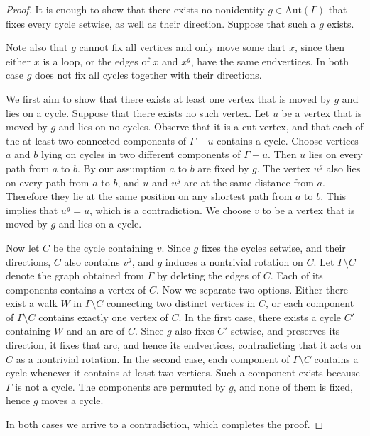 \documentclass{amsart}
\theoremstyle{plain}
\theoremstyle{definition}
\theoremstyle{remark}
\newcommand{\Aut}{\mathrm{Aut}}
\begin{document}
\begin{proof}
  It is enough to show that there
  exists no nonidentity $g\in\Aut(\Gamma)$ that fixes every cycle
  setwise, as well as their direction. Suppose that such a $g$ exists.
  
  Note also that $g$ cannot fix all vertices and only move some dart $x$, since then either $x$ is a loop, or the edges of $x$ and $x^g$, have the same
  endvertices. In both case $g$ does not fix all cycles together with their directions.

  We first aim to show that there exists at least one vertex that is moved by $g$ and lies on a
  cycle. Suppose that there exists no such vertex. Let $u$ be a vertex that is moved by $g$ and lies on
  no cycles. Observe that it is a cut-vertex, and that each of the at least two connected
  components of $\Gamma - u$ contains a cycle. Choose vertices $a$ and $b$ lying on cycles in two different components
  of $\Gamma-u$. Then $u$ lies on every path from $a$ to $b$. By our assumption $a$ to $b$ are fixed by $g$.
The vertex $u^g$ also lies on every path from $a$ to $b$, and $u$ and $u^g$ are at the same distance from $a$.
Therefore they
  lie at the same position on any shortest path from $a$ to $b$. This implies that $u^g=u$, which is a contradiction.
  We choose $v$ to be
  a vertex that is moved by $g$ and lies on a cycle.

  Now let $C$ be the cycle containing $v$. Since $g$ fixes the cycles
  setwise, and their directions, $C$ also contains $v^g$, and $g$ induces
  a nontrivial rotation on $C$. Let $\Gamma \setminus C$ denote the graph obtained from $\Gamma$ by
  deleting the edges of $C$. Each of its components contains a vertex of $C$.
  Now we separate two options. Either there exist a walk $W$
  in $\Gamma \setminus C$ connecting two distinct vertices in $C$, or each component of
  $\Gamma \setminus C$ contains exactly one vertex of $C$. In the first case, there exists a cycle $C'$ containing $W$
  and an arc of $C$. Since $g$ also fixes $C'$ setwise, and preserves its direction,
  it fixes that arc, and hence its endvertices, contradicting that it acts on $C$ as a nontrivial rotation.
  In the second case, each component of
  $\Gamma \setminus C$
  contains a cycle whenever it contains at least two vertices. Such a component exists because
  $\Gamma$ is not a cycle. The
  components are permuted by $g$, and none of them is fixed, hence $g$ moves a cycle.

  In both cases we arrive to a contradiction, which completes the proof.
\end{proof}
\end{document}
